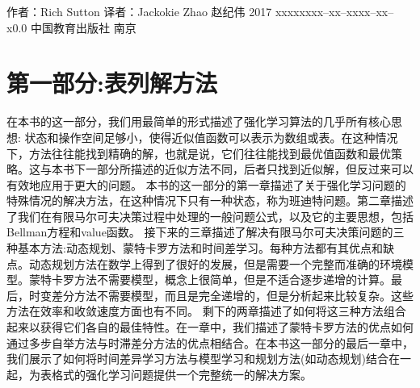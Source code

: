 \documentclass[UTF8]{RL}
\begin{document}
       {作者：Rich Sutton 译者：Jackokie Zhao}
       {赵纪伟}
       {2017}
       {xxxxx}{xxx--xx--xxxx--xx--x}{0.0}
       {中国教育出版社}
       {南京}





\part{第一部分:表列解方法}
在本书的这一部分，我们用最简单的形式描述了强化学习算法的几乎所有核心思想: 状态和操作空间足够小，使得近似值函数可以表示为数组或表。在这种情况下，方法往往能找到精确的解，也就是说，它们往往能找到最优值函数和最优策略。这与本书下一部分所描述的近似方法不同，后者只找到近似解，但反过来可以有效地应用于更大的问题。
本书的这一部分的第一章描述了关于强化学习问题的特殊情况的解决方法，在这种情况下只有一种状态，称为班迪特问题。第二章描述了我们在有限马尔可夫决策过程中处理的一般问题公式，以及它的主要思想，包括Bellman方程和value函数。
接下来的三章描述了解决有限马尔可夫决策问题的三种基本方法:动态规划、蒙特卡罗方法和时间差学习。每种方法都有其优点和缺点。动态规划方法在数学上得到了很好的发展，但是需要一个完整而准确的环境模型。蒙特卡罗方法不需要模型，概念上很简单，但是不适合逐步递增的计算。最后，时变差分方法不需要模型，而且是完全递增的，但是分析起来比较复杂。这些方法在效率和收敛速度方面也有不同。
剩下的两章描述了如何将这三种方法组合起来以获得它们各自的最佳特性。在一章中，我们描述了蒙特卡罗方法的优点如何通过多步自举方法与时滞差分方法的优点相结合。在本书这一部分的最后一章中，我们展示了如何将时间差异学习方法与模型学习和规划方法(如动态规划)结合在一起，为表格式的强化学习问题提供一个完整统一的解决方案。







\end{document}
